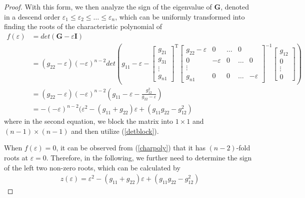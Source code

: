 \begin{proof}
With  this  form,  we then   analyze  the  sign  of  the eigenvalue of $\mathbf G$, denoted  in  a  descend  order  $\varepsilon_{1} \le  \varepsilon_{2}\le \dots  \le \varepsilon_{n}$,  which  can  be  uniformly  transformed  into  finding   the  roots of  the  characteristic polynomial of 
\begin{align}\label{charpoly}
f(\varepsilon)
&
=
det(\mathbf {G} -  \varepsilon \mathbf {I} )
 \nonumber  \\
&=
(g_{22} - \varepsilon)
(- \varepsilon)^{n-2}
det(
g_{11} - \varepsilon
-
\begin{bmatrix}
g_{21}    \\  
g_{31}      \\
\vdots                 \\
g_{n1}  
\end{bmatrix}
^{\mathrm T}
\begin{bmatrix}
 g_{22} - \varepsilon  &  0  &  \dots  &   0  \\  
0  &  - \varepsilon    &  0  &  \dots  &   0      \\
\vdots                 \\
g_{n1}  &  0    &  0  &  \dots  &  - \varepsilon 
\end{bmatrix}^{-1}
\begin{bmatrix}
g_{12}    \\  
0     \\
\vdots                 \\
0  
\end{bmatrix}
)
 \nonumber  \\
&=
(g_{22} - \varepsilon)
(- \varepsilon)^{n-2}
(
g_{11} - \varepsilon
-
\frac{g_{12}^{2}}{g_{22} - \varepsilon}
)
 \nonumber  \\
&=
-
(- \varepsilon)^{n-2}
(
 \varepsilon^{2}
-
(g_{11} +g_{22}) \varepsilon
+
(g_{11} g_{22} 
-
g_{12}^{2}
)
\end{align}
where
  in  the second equation,  we 
block the matrix  into $1 \times 1 $ and  $(n-1) \times (n-1)  $  and  then utilize  (\ref{detblock}).



When 
$ f(\varepsilon) =0$, it  can be  observed
from (\ref{charpoly})  that  it  has  $(n-2)$-fold  roots  at $\varepsilon=0$.
Therefore,  in  the  following, we further  need  to  determine  the sign  of  the  left  two  non-zero   roots, which can  be  calculated  by  
\begin{align}
z(\varepsilon) 
=
\varepsilon^{2}
-
(g_{11} +g_{22}) \varepsilon
+
(g_{11} g_{22} 
-
g_{12}^{2}
)
\end{align}




\end{proof}
